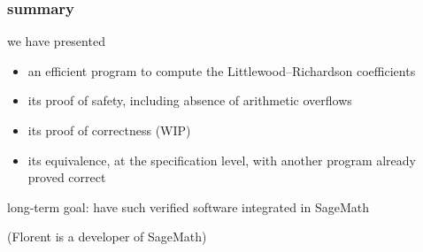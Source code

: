 \documentclass{beamer}
\begin{document}
\begin{frame}\frametitle{summary}
  we have presented
  \begin{itemize}
  \item an efficient program to compute the Littlewood–Richardson coefficients
  \item its proof of safety, including absence of arithmetic overflows
  \item its proof of correctness (WIP)
  \item its equivalence, at the specification level, with another
    program already proved correct
  \end{itemize}

  \bigskip
  long-term goal: have such verified software integrated in SageMath

  (Florent is a developer of SageMath)
\end{frame}
\end{document}
